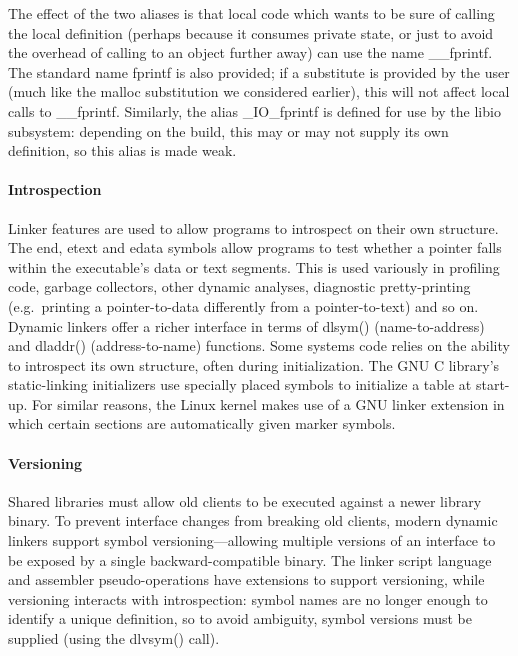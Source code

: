 \documentclass[preprint,10pt]{sigplanconf-pldi16}
\begin{document}
The effect of the two aliases is that
local code which wants to be sure of calling the local definition
(perhaps because it consumes private state, or just to avoid the overhead 
of calling to an object further away) 
can use the name \textsf{\_\_fprintf}.
The standard name \textsf{fprintf} is also provided;
if a substitute is provided by the user 
(much like the \textsf{malloc} substitution we considered earlier),
this will not affect local calls to \textsf{\_\_fprintf}.
Similarly, the alias \textsf{\_IO\_fprintf} is defined
for use by the \textsf{libio} subsystem: 
depending on the build,
this may or may not supply its own definition, 
so this alias is made weak.

\paragraph{Introspection}
Linker features are used to allow programs to introspect on their own structure.
The \textsf{end}, \textsf{etext} and \textsf{edata} symbols 
allow programs to test whether a pointer falls within the 
executable's data or text segments. 
This is used variously in profiling code, garbage collectors,
other dynamic analyses, diagnostic pretty-printing 
(e.g.\ printing a pointer-to-data differently from a pointer-to-text)
and so on.
Dynamic linkers offer a richer interface 
in terms of \textsf{dlsym()} (name-to-address) and \textsf{dladdr()} (address-to-name) functions.
Some systems code relies on the ability to introspect its own structure,
often during initialization.
The GNU C library's static-linking initializers 
use specially placed symbols to initialize a table 
at start-up.
For similar reasons, the Linux kernel 
makes use of a GNU linker extension in which 
certain sections 
are automatically given 
marker symbols.

\paragraph{Versioning} 
Shared libraries must allow old clients to be executed against a newer library binary.
To prevent interface changes from breaking old clients, 
modern dynamic linkers support symbol versioning---allowing
multiple versions of an interface to be exposed by a single
backward-compatible binary.
The linker script language and assembler pseudo-operations have extensions
to support versioning, while 
versioning interacts with introspection: symbol names
are no longer enough to identify a unique definition,
so to avoid ambiguity, symbol versions must be supplied (using the \textsf{dlvsym()} call).
\end{document}
